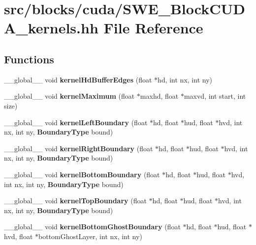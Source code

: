 \section{src/blocks/cuda/\-S\-W\-E\-\_\-\-Block\-C\-U\-D\-A\-\_\-kernels.hh File Reference}
\label{SWE__BlockCUDA__kernels_8hh}
\subsection*{Functions}
\begin{DoxyCompactItemize}
\item 
\-\_\-\-\_\-global\-\_\-\-\_\- void {\bfseries kernel\-Hd\-Buffer\-Edges} (float $\ast$hd, int nx, int ny)\label{SWE__BlockCUDA__kernels_8hh_ad34d42b9197cf6063931cb1bf7c03bd4}

\item 
\-\_\-\-\_\-global\-\_\-\-\_\- void {\bfseries kernel\-Maximum} (float $\ast$maxhd, float $\ast$maxvd, int start, int size)\label{SWE__BlockCUDA__kernels_8hh_ae810017f0a27a38e1c5d78c7130e8ab4}

\item 
\-\_\-\-\_\-global\-\_\-\-\_\- void {\bfseries kernel\-Left\-Boundary} (float $\ast$hd, float $\ast$hud, float $\ast$hvd, int nx, int ny, {\bf Boundary\-Type} bound)\label{SWE__BlockCUDA__kernels_8hh_a70e795bea06be7152de387957e090eb3}

\item 
\-\_\-\-\_\-global\-\_\-\-\_\- void {\bfseries kernel\-Right\-Boundary} (float $\ast$hd, float $\ast$hud, float $\ast$hvd, int nx, int ny, {\bf Boundary\-Type} bound)\label{SWE__BlockCUDA__kernels_8hh_a5b25e2843f0f18a4a5843165ce46054f}

\item 
\-\_\-\-\_\-global\-\_\-\-\_\- void {\bfseries kernel\-Bottom\-Boundary} (float $\ast$hd, float $\ast$hud, float $\ast$hvd, int nx, int ny, {\bf Boundary\-Type} bound)\label{SWE__BlockCUDA__kernels_8hh_a776336452fee130d27d02b109a7ab89d}

\item 
\-\_\-\-\_\-global\-\_\-\-\_\- void {\bfseries kernel\-Top\-Boundary} (float $\ast$hd, float $\ast$hud, float $\ast$hvd, int nx, int ny, {\bf Boundary\-Type} bound)\label{SWE__BlockCUDA__kernels_8hh_a655f11967ba2a7ed124b92a9f1400788}

\item 
\-\_\-\-\_\-global\-\_\-\-\_\- void {\bfseries kernel\-Bottom\-Ghost\-Boundary} (float $\ast$hd, float $\ast$hud, float $\ast$hvd, float $\ast$bottom\-Ghost\-Layer, int nx, int ny)\label{SWE__BlockCUDA__kernels_8hh_a899b7431f0cec06555bf3b0d8e848782}


\end{DoxyCompactItemize}
